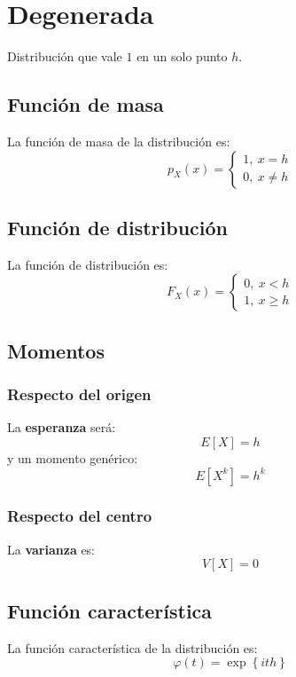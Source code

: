 \section{Degenerada}
\label{sec:degenerada}
Distribución que vale $1$ en un solo punto $h$.

\subsection{Función de masa}
La función de masa de la distribución es:
\[
p_X \left( x \right) = \begin{cases}
    1,\ x = h\\
    0,\ x \neq h
\end{cases}
\]

\subsection{Función de distribución}
La función de distribución es:
\[
F_X\left( x \right) = \begin{cases}
    0,\ x < h\\ 
    1,\ x \ge h
\end{cases}
\]

\subsection{Momentos}

\subsubsection*{Respecto del origen}
La \textbf{esperanza} será:
\[
    E\left[ X \right] = h
\]
y un momento genérico: 
\[
    E\left[ X^k \right] = h^k
\]
\subsubsection*{Respecto del centro}
La \textbf{varianza} es:
\[
    V\left[ X \right] = 0
\]

\subsection{Función característica}
La función característica de la distribución es:
\[
\varphi\left( t \right) = \exp\left\{ ith \right\}
\]

